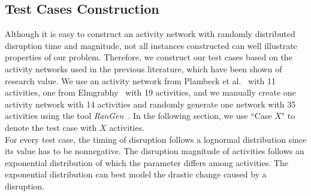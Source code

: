 \documentclass[11pt]{article}
\newcommand{\noi}{\noindent}
\begin{document}
	\subsection{Test Cases Construction} \label{subsec:example}
	\noi Although it is easy to construct an activity network with randomly distributed disruption time and magnitude, not all instances constructed can well illustrate properties of our problem. Therefore, we construct our test cases based on the activity networks used in the previous literature, which have been shown of research value. We use an activity network from Plambeck et al.~\cite{plambeck1996sample} with 11 activities, one from Elmgrabhy~\cite{Elmaghraby77} with 19 activities, and we manually create one activity network with 14 activities and randomly generate one network with 35 activities using the tool \emph{RanGen}~\citep{demeulemeester2003rangen}. In the following section, we use ``Case \(X\)" to denote the test case with \(X\) activities.\\
	\newline
	For every test case, the timing of disruption follows a lognormal distribution since its value has to be nonnegative. The disruption magnitude of activities follows an exponential distribution of which the parameter differs among activities. The exponential distribution can best model the drastic change caused by a disruption.
\end{document}

